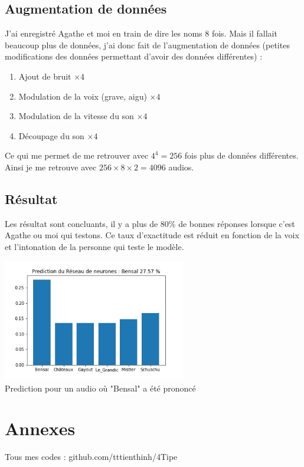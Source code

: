 \documentclass[12pt,a4paper, french]{article}
\begin{document}
\subsection{Augmentation de données}
J'ai enregistré Agathe et moi en train de dire les noms 8 fois. Mais il fallait beaucoup plus de données, j'ai donc fait de l'augmentation de données (petites modifications des données permettant d'avoir des données différentes) :  
\begin{enumerate}
	\item Ajout de bruit $\times 4$
	\item Modulation de la voix (grave, aigu) $\times 4$
	\item Modulation de la vitesse du son $\times 4$
	\item Découpage du son $\times 4$
\end{enumerate}
Ce qui me permet de me retrouver avec $4^4 = 256$ fois plus de données différentes. Ainsi je me retrouve avec $256 \times 8 \times 2 = 4096$ audios.

\subsection{Résultat}
Les résultat sont concluants, il y a plus de 80\% de bonnes réponses lorsque c'est Agathe ou moi qui testons. Ce taux d'exactitude est réduit en fonction de la voix et l'intonation de la personne qui teste le modèle. 

\begin{center}
    \includegraphics[width=8cm]{4-Resultat Bensal.jpg} \\
    Prediction pour un audio où "Bensal" a été prononcé
\end{center}

\section*{Annexes}
Tous mes codes : github.com/tttienthinh/4Tipe
\end{document}
